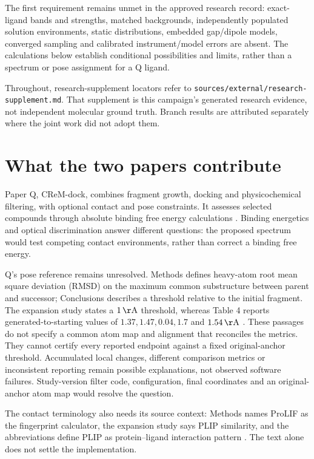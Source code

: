 \documentclass{article}
\begin{document}
The first requirement remains unmet in the approved research record: exact-ligand bands and strengths, matched backgrounds, independently populated solution environments, static distributions, embedded gap/dipole models, converged sampling and calibrated instrument/model errors are absent. The calculations below establish conditional possibilities and limits, rather than a spectrum or pose assignment for a Q ligand.

Throughout, research-supplement locators refer to \texttt{sources/external/research-supplement.md}. That supplement is this campaign's generated research evidence, not independent molecular ground truth. Branch results are attributed separately where the joint work did not adopt them.

\section{What the two papers contribute}

Paper Q, CReM-dock, combines fragment growth, docking and physicochemical filtering, with optional contact and pose constraints. It assesses selected compounds through absolute binding free energy calculations \cite{Q}. Binding energetics and optical discrimination answer different questions: the proposed spectrum would test competing contact environments, rather than correct a binding free energy.

Q's pose reference remains unresolved. Methods defines heavy-atom root mean square deviation (RMSD) on the maximum common substructure between parent and successor; Conclusions describes a threshold relative to the initial fragment. The expansion study states a \(1\,\mathrm{\AA}\) threshold, whereas Table 4 reports generated-to-starting values of \(1.37,1.47,0.04,1.7\) and \(1.54\,\mathrm{\AA}\) \cite{Q}. These passages do not specify a common atom map and alignment that reconciles the metrics. They cannot certify every reported endpoint against a fixed original-anchor threshold. Accumulated local changes, different comparison metrics or inconsistent reporting remain possible explanations, not observed software failures. Study-version filter code, configuration, final coordinates and an original-anchor atom map would resolve the question.

The contact terminology also needs its source context: Methods names ProLIF as the fingerprint calculator, the expansion study says PLIP similarity, and the abbreviations define PLIP as protein--ligand interaction pattern \cite{Q}. The text alone does not settle the implementation.
\end{document}
